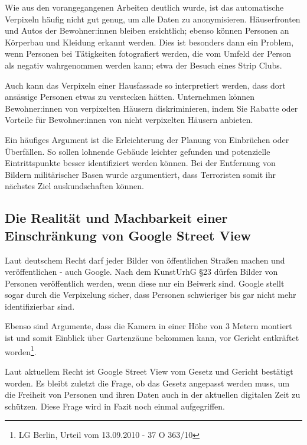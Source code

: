 Wie aus den vorangegangenen Arbeiten deutlich wurde, ist das automatische
Verpixeln häufig nicht gut genug, um alle Daten zu anonymisieren. Häuserfronten
und Autos der Bewohner:innen bleiben ersichtlich; ebenso können Personen an
Körperbau und Kleidung erkannt werden. Dies ist besonders dann ein Problem, wenn
Personen bei Tätigkeiten fotografiert werden, die vom Umfeld der Person als
negativ wahrgenommen werden kann; etwa der Besuch eines Strip Clubs.

Auch kann das Verpixeln einer Hausfassade so interpretiert werden, dass dort
ansässige Personen etwas zu verstecken hätten. Unternehmen können Bewohner:innen
von verpixelten Häusern diskriminieren, indem Sie Rabatte oder Vorteile für
Bewohner:innen von nicht verpixelten Häusern anbieten.

Ein häufiges Argument ist die Erleichterung der Planung von Einbrüchen oder
Überfällen. So sollen lohnende Gebäude leichter gefunden und potenzielle
Eintrittspunkte besser identifiziert werden können.  Bei der Entfernung von
Bildern militärischer Basen wurde argumentiert, dass Terroristen somit ihr
nächstes Ziel auskundschaften können.

\subsection{Die Realität und Machbarkeit einer Einschränkung von Google Street View}

Laut deutschem Recht darf jeder Bilder von öffentlichen Straßen machen und
veröffentlichen - auch Google. Nach dem KunstUrhG §23 dürfen Bilder von Personen
veröffentlich werden, wenn diese nur ein Beiwerk sind. Google stellt sogar durch
die Verpixelung sicher, dass Personen schwieriger bis gar nicht mehr
identifizierbar sind.

Ebenso sind Argumente, dass die Kamera in einer Höhe von 3 Metern montiert ist
und somit Einblick über Gartenzäune bekommen kann, vor Gericht entkräftet
worden\footnote{LG Berlin, Urteil vom 13.09.2010 - 37 O 363/10}.

Laut aktuellem Recht ist Google Street View vom Gesetz und Gericht bestätigt
worden. Es bleibt zuletzt die Frage, ob das Gesetz angepasst werden muss, um die
Freiheit von Personen und ihren Daten auch in der aktuellen digitalen Zeit zu
schützen. Diese Frage wird in Fazit noch einmal aufgegriffen.
